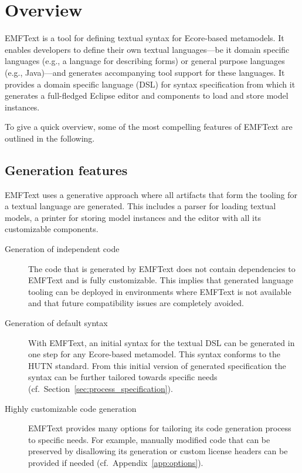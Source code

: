 \chapter{Overview}
EMFText is a tool for defining textual syntax for Ecore-based metamodels. It 
enables developers to define their own textual languages---be it domain
specific languages (e.g., a language for describing forms) or general purpose 
languages (e.g., Java)---and generates accompanying tool support for these 
languages. It provides a domain specific language (DSL) for syntax 
specification from which it generates a full-fledged Eclipse editor and 
components to load and store model instances.

To give a quick overview, some of the most compelling features of EMFText are 
outlined in the following.

\section{Generation features}
EMFText uses a generative approach where all artifacts that form the tooling for
a textual language are generated. This includes a parser for loading textual 
models, a printer for storing model instances and the editor with all its
customizable components.

\begin{description}

  \item[Generation of independent code]
        The code that is generated by EMFText does not contain dependencies
        to EMFText and is fully customizable. This implies that generated 
        language tooling can be deployed in environments where EMFText is not 
        available and that future compatibility issues are completely avoided.

  \item[Generation of default syntax]
        With EMFText, an initial syntax for the textual DSL can be generated 
        in one step for any Ecore-based metamodel. This syntax conforms to the 
        HUTN standard. From this initial version of generated specification the 
        syntax can be further tailored towards specific needs (cf.~Section~\ref{sec:process_specification}).
        
  \item[Highly customizable code generation]
        EMFText provides many options for tailoring its code generation process
        to specific needs. For example, manually modified code that can be preserved
        by disallowing its generation or custom license headers can be provided 
        if needed (cf.~Appendix~\ref{app:options}\label{app:options}).

\end{description}


